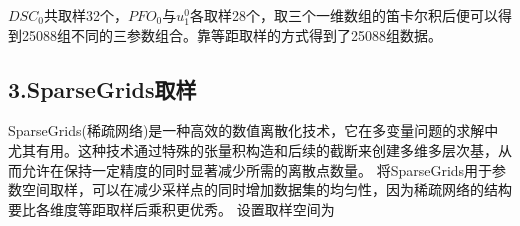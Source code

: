 \documentclass{article}
\begin{document}
$DSC_0$共取样32个，$PFO_0$与$u_1^0$各取样28个，取三个一维数组的笛卡尔积后便可以得到25088组不同的三参数组合。靠等距取样的方式得到了25088组数据。

\subsection*{3.SparseGrids取样}
SparseGrids(稀疏网络)是一种高效的数值离散化技术，它在多变量问题的求解中尤其有用。这种技术通过特殊的张量积构造和后续的截断来创建多维多层次基，从而允许在保持一定精度的同时显著减少所需的离散点数量。
将SparseGrids用于参数空间取样，可以在减少采样点的同时增加数据集的均匀性，因为稀疏网络的结构要比各维度等距取样后乘积更优秀。
设置取样空间为
\end{document}
